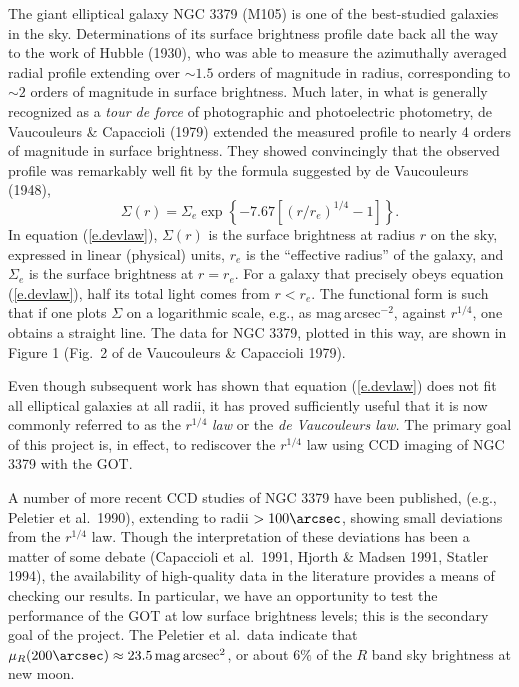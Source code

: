 \sciencejustification

The giant elliptical galaxy NGC 3379 (M105) is one of the best-studied
galaxies in the sky. Determinations of its surface brightness profile date
back all the way to the work of Hubble (1930), who was able to measure the
azimuthally averaged radial profile extending over $\sim 1.5$ orders of
magnitude in radius, corresponding to $\sim 2$ orders of magnitude in
surface brightness.  Much later, in what is generally recognized as a
{\it tour de force\/} of photographic and photoelectric photometry,
de Vaucouleurs \& Capaccioli (1979) extended the measured profile to
nearly 4 orders of magnitude in surface brightness. They showed
convincingly that the observed profile was remarkably well fit by the
formula suggested by de Vaucouleurs (1948),
\begin{equation}\label{e.devlaw}
\Sigma(r) = \Sigma_e \exp \left\{-7.67\left[(r/r_e)^{1/4}-1\right]\right\}.
\end{equation}
In equation (\ref{e.devlaw}), $\Sigma(r)$ is the surface brightness at
radius $r$ on the sky, expressed in linear (physical) units, $r_e$ is the
``effective radius'' of the galaxy, and $\Sigma_e$ is the surface
brightness at $r=r_e$. For a galaxy that precisely obeys equation
(\ref{e.devlaw}), half its total light comes from $r<r_e$. 
The functional form is such that if one plots $\Sigma$ on a logarithmic
scale, e.g., as mag$\,$arcsec$^{-2}$, against $r^{1/4}$, one obtains a
straight line. The data for NGC 3379, plotted in this way, are shown in
Figure 1 (Fig.\ 2 of de Vaucouleurs \& Capaccioli 1979).

Even though subsequent work has shown that equation (\ref{e.devlaw})
does not fit all elliptical galaxies at all radii, it has proved sufficiently
useful that it is now commonly referred to as the $r^{1/4}$ {\it law\/}
or the {\it de Vaucouleurs law.} The primary goal of this project is, in
effect, to rediscover the $r^{1/4}$ law using CCD imaging of NGC 3379
with the GOT.

A number of more recent CCD studies of NGC 3379 have been published,
(e.g., Peletier et al.\ 1990), extending to radii $> 100\arcsec$,
showing small deviations from the $r^{1/4}$ law. Though the
interpretation of these deviations has been a matter of some debate
(Capaccioli et al.\ 1991, Hjorth \& Madsen 1991, Statler 1994), the
availability of high-quality data in the literature provides a means of
checking our results. In particular, we have an opportunity to test the
performance of the GOT at low surface brightness levels; this is the
secondary goal of the project. The Peletier et al.\ data indicate that
$\mu_R(200\arcsec) \approx 23.5\,{\rm mag}\,{\rm arcsec}^2$, or about
$6\%$ of the $R$ band sky brightness at new moon.

